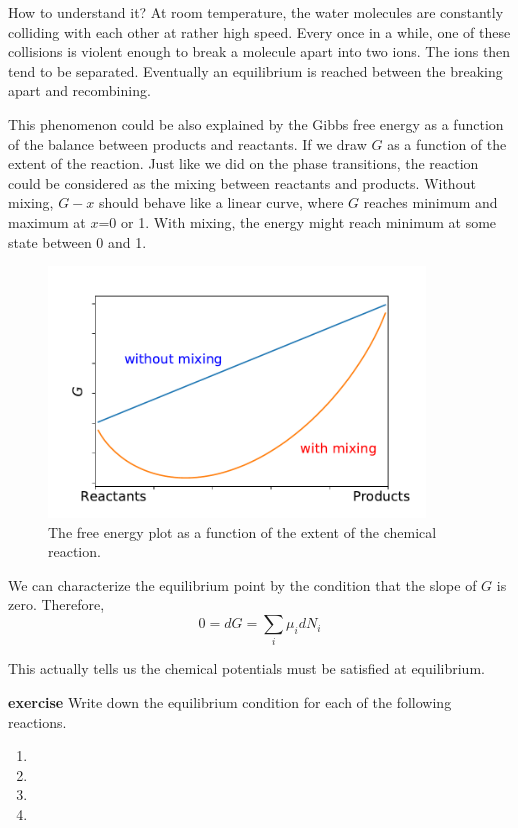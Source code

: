 How to understand it? At room temperature, the water molecules are constantly colliding with each other at rather high speed. Every once in a while, one of these collisions is violent enough to break a molecule apart into two ions. The ions then tend to be separated. Eventually an equilibrium is reached between the breaking apart and recombining.

This phenomenon could be also explained by the Gibbs free energy as a function of the balance between products and reactants. If we draw $G$ as a function of the extent of the reaction. Just like we did on the phase transitions, the reaction could be considered as the mixing between reactants and products. Without mixing, $G-x$ should behave like a linear curve, where $G$ reaches minimum and maximum at $x$=0 or 1. With mixing, the energy might reach minimum at some state between 0 and 1.

\begin{figure}[h]
\centering
\includegraphics[width=10cm]{imgs/Reaction.pdf}
\caption{The free energy plot as a function of the extent of the chemical reaction. }
\end{figure}


We can characterize the equilibrium point by the condition that the slope of $G$ is zero. Therefore,
\begin{equation} 
0 = dG = \sum_i \mu_i dN_i
\end{equation} 

This actually tells us the chemical potentials must be satisfied at equilibrium.

{\bf exercise} Write down the equilibrium condition for each of the following reactions.
\begin{enumerate}
\item {}
\item {}
\item {}
\item {}
\end{enumerate}

